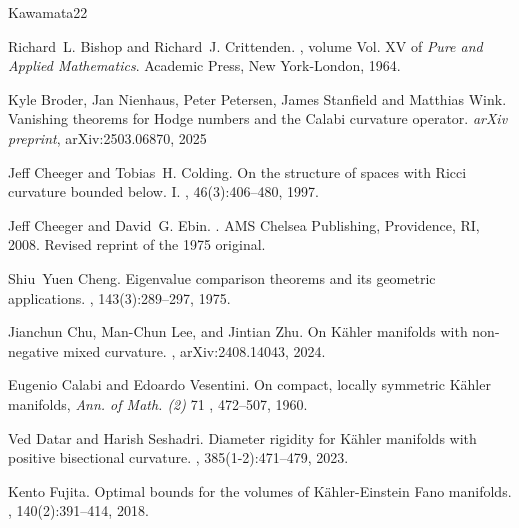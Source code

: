 \documentclass[12pt,reqno]{amsart}
\theoremstyle{plain}
\theoremstyle{definition}
\renewcommand{\>}{\rightarrow}
\numberwithin{equation}{section} %
\begin{document}
\begin{thebibliography}{Kawamata22}



    Richard~L. Bishop and Richard~J. Crittenden.
    , volume Vol. XV of {\em Pure and Applied Mathematics}.
    \newblock Academic Press, New York-London, 1964.

      Kyle Broder, Jan Nienhaus, Peter Petersen, James Stanfield and Matthias Wink. Vanishing theorems for Hodge numbers and the Calabi curvature operator.  {\em arXiv preprint}, arXiv:2503.06870, 2025




    Jeff Cheeger and Tobias~H. Colding.
    \newblock On the structure of spaces with {R}icci curvature bounded below. {I}.
    , 46(3):406--480, 1997.




    Jeff Cheeger and David~G. Ebin.
    .
    \newblock AMS Chelsea Publishing, Providence, RI, 2008.
    \newblock Revised reprint of the 1975 original.


    Shiu~Yuen Cheng.
    \newblock Eigenvalue comparison theorems and its geometric applications.
    , 143(3):289--297, 1975.



    Jianchun Chu, Man-Chun Lee, and Jintian Zhu.
    \newblock On K\"ahler manifolds with non-negative mixed curvature.
    , arXiv:2408.14043, 2024.



     Eugenio Calabi and Edoardo Vesentini.  On compact, locally symmetric K\"ahler manifolds,  \emph{Ann.
        of Math. (2)}  71 , 472--507, 1960.




    Ved Datar and Harish Seshadri.
    \newblock Diameter rigidity for {K}\"ahler manifolds with positive bisectional curvature.
    , 385(1-2):471--479, 2023.



    Kento Fujita.
    \newblock Optimal bounds for the volumes of {K}\"ahler-{E}instein {F}ano manifolds.
    , 140(2):391--414, 2018.











\end{thebibliography}
\end{document}
